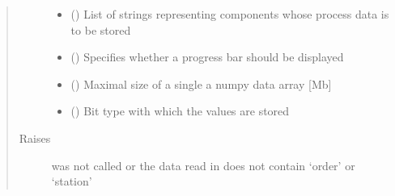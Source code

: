\documentclass[letterpaper,10pt,english]{sphinxmanual}
\begin{document}
\begin{fulllineitems}
\begin{fulllineitems}
\begin{quote}
\begin{description}
\begin{itemize}
\item {} 
\sphinxAtStartPar
{} (\sphinxstyleliteralemphasis{\sphinxupquote{{[}}}\sphinxstyleliteralemphasis{\sphinxupquote{{]}}}\sphinxstyleliteralemphasis{\sphinxupquote{, }}) \textendash{} List of strings representing components whose process data is to be stored

\item {} 
\sphinxAtStartPar
{} (\sphinxstyleliteralemphasis{\sphinxupquote{, }}) \textendash{} Specifies whether a progress bar should be displayed

\item {} 
\sphinxAtStartPar
{} (\sphinxstyleliteralemphasis{\sphinxupquote{, }}) \textendash{} Maximal size of a single a numpy data array {[}Mb{]}

\item {} 
\sphinxAtStartPar
{} (\sphinxstyleliteralemphasis{\sphinxupquote{, }}) \textendash{} Bit type with which the values are stored

\end{itemize}

\item[{Raises}] \leavevmode
\sphinxAtStartPar
{} \textendash{}  was not called or the data read in does not contain ‘order’ or ‘station’

\end{description}\end{quote}

\end{fulllineitems}



\end{fulllineitems}
\end{document}
